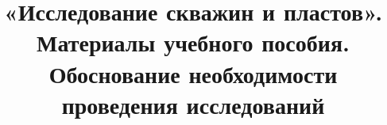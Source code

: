 \documentclass{article}
\begin{document}
\title{«Исследование скважин и пластов». Материалы учебного пособия. Обоснование необходимости проведения исследований}

\maketitle







\printbibliography
\end{document}
